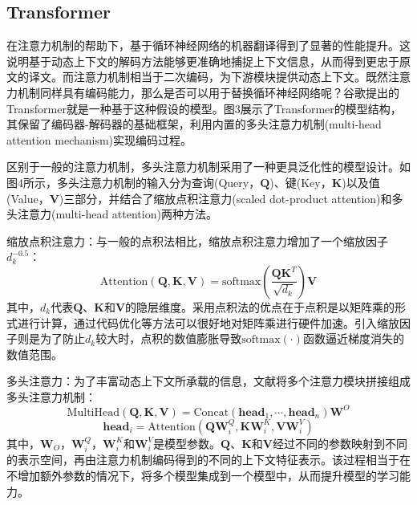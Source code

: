 
\subsection{Transformer}
在注意力机制的帮助下，基于循环神经网络的机器翻译得到了显著的性能提升。这说明基于动态上下文的解码方法能够更准确地捕捉上下文信息，从而得到更忠于原文的译文。而注意力机制相当于二次编码，为下游模块提供动态上下文。既然注意力机制同样具有编码能力，那么是否可以用于替换循环神经网络呢？谷歌提出的Transformer\cite{5_DBLP:journals/corr/VaswaniSPUJGKP17}就是一种基于这种假设的模型。图3展示了Transformer的模型结构，其保留了编码器-解码器的基础框架，利用内置的多头注意力机制(multi-head attention mechanism)实现编码过程。

区别于一般的注意力机制，多头注意力机制采用了一种更具泛化性的模型设计。如图4所示，多头注意力机制的输入分为查询(Query，$\boldsymbol{Q}$)、键(Key，$\boldsymbol{K}$)以及值(Value，$\boldsymbol{V}$)三部分，并结合了缩放点积注意力(scaled dot-product attention)和多头注意力(multi-head attention)两种方法。

缩放点积注意力：与一般的点积法相比，缩放点积注意力增加了一个缩放因子$d_k^{-0.5}$：
\begin{equation}
    \mathrm{Attention}(\boldsymbol{Q},\boldsymbol{K},\boldsymbol{V}) = \mathrm{softmax} \left( \frac{\boldsymbol{Q}\boldsymbol{K}^T}{\sqrt{d_k}} \right) \boldsymbol{V}
\end{equation}
其中，$d_k$代表$\boldsymbol{Q}$、$\boldsymbol{K}$和$\boldsymbol{V}$的隐层维度。采用点积法的优点在于点积是以矩阵乘的形式进行计算，通过代码优化等方法可以很好地对矩阵乘进行硬件加速。引入缩放因子则是为了防止$d_k$较大时，点积的数值膨胀导致$\mathrm{softmax}(\cdot)$函数逼近梯度消失的数值范围。

多头注意力：为了丰富动态上下文所承载的信息，文献\cite{5_DBLP:journals/corr/VaswaniSPUJGKP17}将多个注意力模块拼接组成多头注意力机制：
\begin{equation}
    \mathrm{MultiHead}(\boldsymbol{Q},\boldsymbol{K},\boldsymbol{V}) = \mathrm{Concat}(\boldsymbol{head}_1, \cdots, \boldsymbol{head}_n)\boldsymbol{W}^O
\end{equation}
\begin{equation}
    \boldsymbol{head}_i = \mathrm{Attention}(\boldsymbol{Q}\boldsymbol{W}_i^Q,\boldsymbol{K}\boldsymbol{W}_i^K,\boldsymbol{V}\boldsymbol{W}_i^V)
\end{equation}
其中，$\boldsymbol{W}_O$，$\boldsymbol{W}_i^Q$，$\boldsymbol{W}_i^K$和$\boldsymbol{W}_i^V$是模型参数。$\boldsymbol{Q}$、$\boldsymbol{K}$和$\boldsymbol{V}$经过不同的参数映射到不同的表示空间，再由注意力机制编码得到的不同的上下文特征表示。该过程相当于在不增加额外参数的情况下，将多个模型集成到一个模型中，从而提升模型的学习能力。

